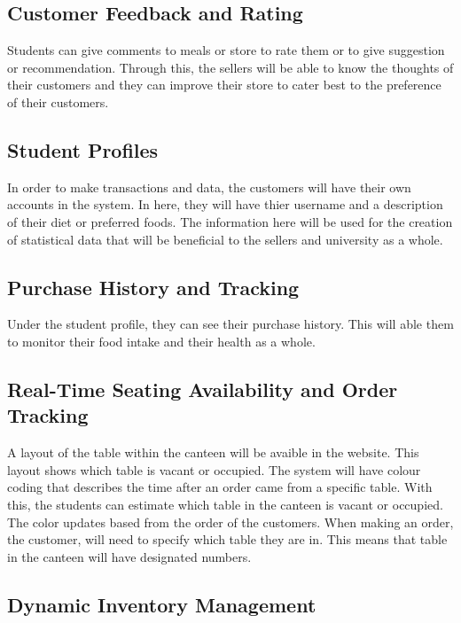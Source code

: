 \documentclass{article}
\begin{document}
\subsection{Customer Feedback and Rating}
Students can give comments to meals or store to rate them or to give suggestion or recommendation. Through this, the sellers will be able to know the thoughts of their customers and they can improve their store to cater best to the preference of their customers.

\subsection{Student Profiles}
In order to make transactions and data, the customers will have their own accounts in the system. In here, they will have thier username and a description of their diet or preferred foods. The information here will be used for the creation of statistical data that will be beneficial to the sellers and university as a whole.

\subsection{Purchase History and Tracking}
Under the student profile, they can see their purchase history. This will able them to monitor their food intake and their health as a whole.

\subsection{Real-Time Seating Availability and Order Tracking}
A layout of the table within the canteen will be avaible in the website. This layout shows which table is vacant or occupied. The system will have colour coding that describes the time after an order came from a specific table. With this, the students can estimate which table in the canteen is vacant or occupied. The color updates based from the order of the customers. When making an order, the customer, will need to specify which table they are in. This means that table in the canteen will have designated numbers. 

\subsection{Dynamic Inventory Management}


\end{document}
